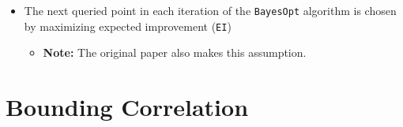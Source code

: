 \documentclass[11pt]{article}
\numberwithin{figure}{section}
\numberwithin{equation}{section}
\def\BayesOpt{\texttt{BayesOpt}}
\def\EI{\texttt{EI}}
\begin{document}
\begin{itemize}[label=]
  \item The next queried point in each iteration of the \BayesOpt{} algorithm is chosen by maximizing expected improvement (\EI{})
  \begin{itemize}[label=]
    \item \textbf{Note:} The original paper also makes this assumption.
  \end{itemize}
  
\end{itemize}

\section{Bounding Correlation}
\end{document}
